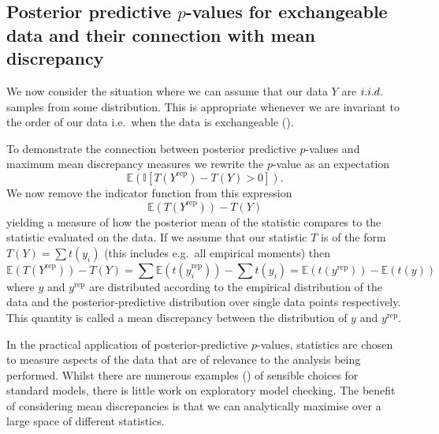 \documentclass{article} %
\def\ie{i.e.\ }
\def\eg{e.g.\ }
\begin{document}
\subsection{Posterior predictive $p$-values for exchangeable data and their connection with mean discrepancy}

We now consider the situation where we can assume that our data $Y$ are $i.i.d.\ $ samples from some distribution.
This is appropriate whenever we are invariant to the order of our data \ie when the data is exchangeable ().

To demonstrate the connection between posterior predictive $p$-values and maximum mean discrepancy measures we rewrite the $p$-value as an expectation
\begin{equation}
\mathbb{E}(\mathbb{I}[T(Y^\textrm{rep}) - T(Y) > 0]).
\end{equation}
We now remove the indicator function from this expression
\begin{equation}
  \mathbb{E}(T(Y^\textrm{rep})) - T(Y)
\end{equation}
yielding a measure of how the posterior mean of the statistic compares to the statistic evaluated on the data.
If we assume that our statistic $T$ is of the form $T(Y) = \sum t(y_i)$ (this includes \eg all empirical moments) then
\begin{equation}
\mathbb{E}(T(Y^\textrm{rep})) - T(Y) = \sum \mathbb{E}(t(y_i^\textrm{rep})) - \sum t(y_i) = \mathbb{E}(t(y^\textrm{rep})) - \mathbb{E}(t(y))
\end{equation}
where $y$ and $y^\textrm{rep}$ are distributed according to the empirical distribution of the data and the posterior-predictive distribution over single data points respectively.
This quantity is called a mean discrepancy between the distribution of $y$ and $y^\textrm{rep}$.

In the practical application of posterior-predictive $p$-values, statistics are chosen to measure aspects of the data that are of relevance to the analysis being performed.
Whilst there are numerous examples () of sensible choices for standard models, there is little work on exploratory model checking.
The benefit of considering mean discrepancies is that we can analytically maximise over a large space of different statistics.

\end{document}
